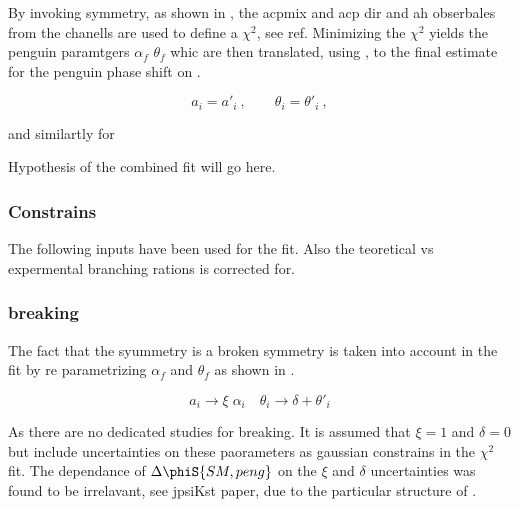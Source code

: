By invoking \grpsuthree symmetry, as shown in , the acpmix and acp dir and ah obserbales from the chanells \BsJpsiPhi \BsJpsiRho \BsJpsiKst
are used to define a $\chi^2$, see ref. Minimizing the $\chi^2$ yields the penguin paramtgers $\alpha_f$ $\theta_f$ whic are
then translated, using , to the final estimate for the penguin phase shift on \phis.

\begin{equation}
a_i = a'_i\:,\qquad \theta_i = \theta'_i\:,
\label{su3_apply}
\end{equation}

and similartly for \BsJpsiRho

Hypothesis of the combined fit will go here.
\subsubsection{Constrains}
The following inputs have been used for the fit.
Also the teoretical vs expermental branching rations is corrected for.


\subsubsection{\grpsuthree breaking}
\label{su3_breaking}

The fact that the \grpsuthree syummetry is a broken symmetry is taken into account in the fit by re parametrizing
$\alpha_f$ and $\theta_f$ as shown in .

\begin{equation}
a_i \to \xi \; \alpha_i \quad \theta_i \to \delta + \theta'_i
\label{su3_breaking}
\end{equation}

As there are no dedicated studies for \grpsuthree breaking. It is assumed that $\xi=1$ and $\delta=0$ but include uncertainties
on these paorameters as gaussian constrains in the $\chi^2$ fit. The dependance of $\Delta\phiS{SM,peng}$ on the $\xi$ and $\delta$
uncertainties was found to be irrelavant, {\color{red} see jpsiKst paper}, due to the particular structure of .
